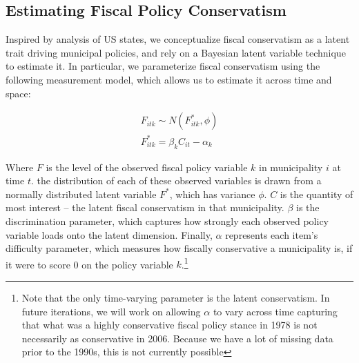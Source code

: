 \documentclass[a4paper,12pt]{article}
\begin{document}


\subsection*{Estimating Fiscal Policy Conservatism}
Inspired by \cite{caughey2016dynamics} analysis of US states, we conceptualize fiscal conservatism as a latent trait driving municipal policies, and rely on a Bayesian latent variable technique to estimate it. In particular, we parameterize fiscal conservatism using the following measurement model, which allows us to estimate it across time and space:

\begin{gather*}
F_{itk} \sim N(F^*_{itk}, \phi)\\
F^*_{itk} = \beta_k C_{it} - \alpha_{k}
\end{gather*}

\noindent Where $F$ is the level of the observed fiscal policy variable $k$ in municipality $i$ at time $t$. the distribution of each of these observed variables is drawn from a normally distributed latent variable $F^*$, which has variance $\phi$. $C$ is the quantity of most interest -- the latent fiscal conservatism in that municipality. $\beta$ is the discrimination parameter, which captures how strongly each observed policy variable loads onto the latent dimension. Finally, $\alpha$ represents each item's difficulty parameter, which measures how fiscally conservative a municipality is, if it were to score 0 on the policy variable $k$.\footnote{Note that the only time-varying parameter is the latent conservatism. In future iterations, we will work on allowing $\alpha$ to vary across time capturing that what was a highly conservative fiscal policy stance in 1978 is not necessarily as conservative in 2006. Because we have a lot of missing data prior to the 1990s, this is not currently possible}
\end{document}

